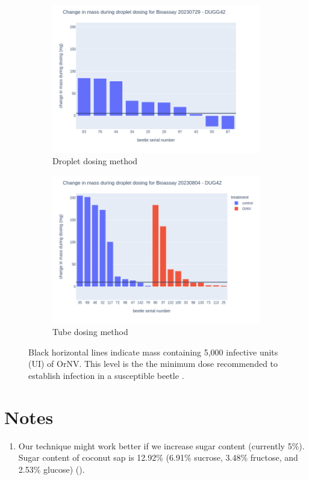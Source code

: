 \documentclass[12pt,letterpaper,english,bibliography=totocnumbered, abstract=on]{scrartcl}
\begin{document}
\begin{figure}[H]
	\centering
	\begin{subfigure}{.5\textwidth}
		\centering
		\includegraphics[width=\linewidth]{images/bioassay1}
		\caption{Droplet dosing method}
		\label{fig:sub1}
	\end{subfigure}%
	\begin{subfigure}{.5\textwidth}
		\centering
		\includegraphics[width=\linewidth]{images/bioassay2}
		\caption{Tube dosing method}
		\label{fig:sub2}
	\end{subfigure}
	\caption{Black horizontal lines indicate mass containing 5,000 infective units (UI) of OrNV. This level is the the minimum dose recommended to establish infection in a susceptible beetle \parencite{AgResearch2023}.}
	\label{fig:paired-plots}
\end{figure}


\section{Notes}

\begin{enumerate}
	\item Our technique might work better if we increase sugar content (currently 5\%). Sugar content of coconut sap is 12.92\% (6.91\% sucrose, 3.48\% fructose, and 2.53\% glucose) (\cite{asgharCoconutCocosNucifera2019}).	
\end{enumerate}


\printbibliography
\end{document}
